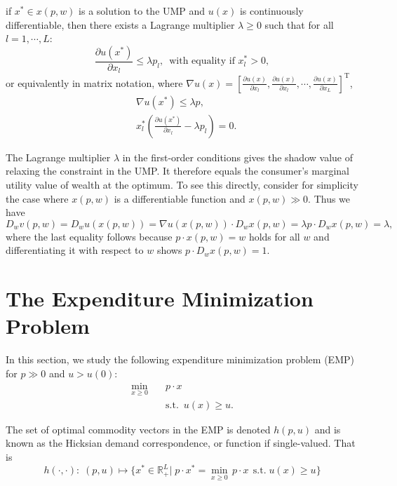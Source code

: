 \documentclass[12pt,fleqn]{book} %
\begin{document}
\begin{theorem}
	if $x^* \in x(p,w)$ is a solution to the UMP and $u(x)$ is continuously differentiable, then there exists a
	Lagrange multiplier $\lambda\ge0$ such that for all $l = 1,\cdots, L$:
	\[
	\frac{\partial u(x^*)}{\partial x_l}\le \lambda p_l,\ \;\text{with equality if } x^*_l > 0,
	\]
	or equivalently in matrix notation, where $\nabla u(x)= \left[\frac{\partial u(x)}{\partial x_l},\frac{\partial u(x)}{\partial x_l},\cdots,\frac{\partial u(x)}{\partial x_L} \right]^\mathrm{T}$,
	\begin{align*}
	&\nabla u(x^*)\le \lambda p, \\
    &x^*_l\left(\frac{\partial u(x^*)}{\partial x_l}-\lambda p_l\right)= 0.
	\end{align*}
\end{theorem}

The Lagrange multiplier $\lambda$ in the first-order conditions gives
the shadow value of relaxing the constraint in the UMP. It therefore equals the consumer's marginal utility value of wealth at the optimum.
To see this directly, consider for simplicity the case where $x(p, w)$
is a differentiable function and $x(p, w) \gg 0$. Thus we have
\[
D_wv(p,w)=D_wu(x(p,w))=\nabla u(x(p,w))\cdot D_wx(p,w)=\lambda p\cdot D_wx(p,w)=\lambda,
\]
where the last equality follows because $p\cdot x(p, w) = w$ holds for all $w$ and differentiating it with respect to $w$ shows $p\cdot D_wx(p,w)= 1$.



\section{The Expenditure Minimization Problem}

In this section, we study the following expenditure minimization problem (EMP) for
$p\gg 0$ and $u > u(0)$:
\begin{align*}
\min_{x\ge 0} \quad &  p\cdot x\\
& \mathrm{s.t.}\ \; u(x)\ge u.
\end{align*}





\begin{definition}
The set of optimal commodity vectors in the EMP is denoted $h(p, u)$ and is known as the Hicksian demand correspondence, or function if single-valued. That is
\[
h(\cdot,\cdot):\;(p,u)\mapsto \{x^*\in\mathbb{R}_+^L|\;p\cdot x^*=\min_{x\ge 0}\, p\cdot x\ \ \mathrm{s.t.}\; u(x)\ge u\}
\]	
\end{definition}
\end{document}
